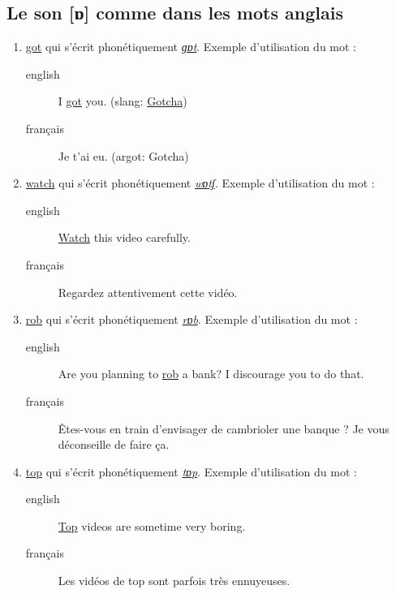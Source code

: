 \subsection{Le son [ɒ] comme dans les mots anglais}
\label{sec:orgb3f3634}
\begin{enumerate}
\item \href{http://www.wordreference.com/enfr/got}{got} qui s'écrit phonétiquement \href{https://en.oxforddictionaries.com/definition/got}{\emph{ɡɒt}}. Exemple d'utilisation du mot :
\begin{description}
\item[{english}] \textenglish{I \href{https://youtu.be/Bo09BiPb24Y}{got} you. (slang: \href{https://youtu.be/EWRaAbVUkjA}{Gotcha})}
\item[{français}] Je t'ai eu. (argot: Gotcha)
\end{description}
\item \href{http://www.wordreference.com/enfr/watch}{watch} qui s'écrit phonétiquement \href{https://en.oxforddictionaries.com/definition/watch}{\emph{wɒtʃ}}. Exemple d'utilisation du mot :
\begin{description}
\item[{english}] \textenglish{\href{https://youtu.be/qOs8MagOfwg}{Watch} this video carefully.}
\item[{français}] Regardez attentivement cette vidéo.
\end{description}
\item \href{http://www.wordreference.com/enfr/rob}{rob} qui s'écrit phonétiquement \href{https://en.oxforddictionaries.com/definition/rob}{\emph{rɒb}}. Exemple d'utilisation du mot :
\begin{description}
\item[{english}] \textenglish{Are you planning to \href{https://youtu.be/X3uZ0Gf104A}{rob} a bank? I discourage you to do
that.}
\item[{français}] Êtes-vous en train d'envisager de cambrioler une
banque ? Je vous déconseille de faire ça.
\end{description}
\item \href{http://www.wordreference.com/enfr/top}{top} qui s'écrit phonétiquement \href{https://en.oxforddictionaries.com/definition/top}{\emph{tɒp}}. Exemple d'utilisation du mot : 
\begin{description}
\item[{english}] \textenglish{\href{https://youtu.be/gPaD513xWOY}{Top} videos are sometime very boring.}
\item[{français}] Les vidéos de top sont parfois très ennuyeuses.
\end{description}
\end{enumerate}
